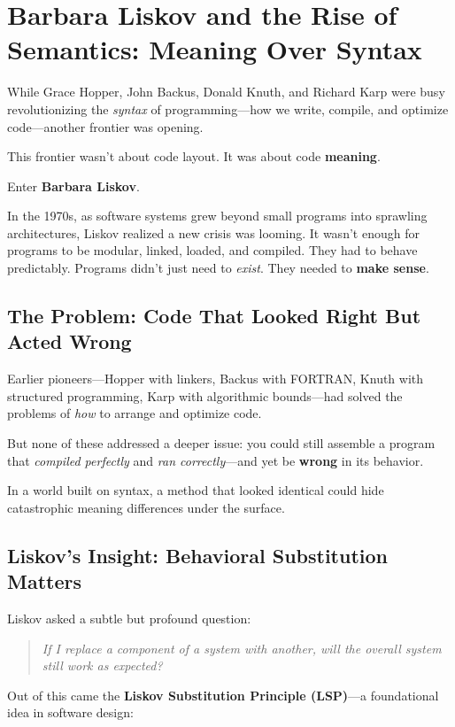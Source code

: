 \section{Barbara Liskov and the Rise of Semantics: Meaning Over Syntax}

While Grace Hopper, John Backus, Donald Knuth, and Richard Karp were busy revolutionizing the \textit{syntax} of programming—how we write, compile, and optimize code—another frontier was opening.

This frontier wasn’t about code layout. It was about code \textbf{meaning}.

Enter \textbf{Barbara Liskov}.

In the 1970s, as software systems grew beyond small programs into sprawling architectures, Liskov realized a new crisis was looming. It wasn’t enough for programs to be modular, linked, loaded, and compiled. They had to behave predictably. Programs didn’t just need to \emph{exist}. They needed to \textbf{make sense}.

\subsection{The Problem: Code That Looked Right But Acted Wrong}

Earlier pioneers—Hopper with linkers, Backus with FORTRAN, Knuth with structured programming, Karp with algorithmic bounds—had solved the problems of \textit{how} to arrange and optimize code.

But none of these addressed a deeper issue: you could still assemble a program that \textit{compiled perfectly} and \textit{ran correctly}—and yet be \textbf{wrong} in its behavior.

In a world built on syntax, a method that looked identical could hide catastrophic meaning differences under the surface.

\subsection{Liskov’s Insight: Behavioral Substitution Matters}

Liskov asked a subtle but profound question:

\begin{quote}
\textit{If I replace a component of a system with another, will the overall system still work as expected?}
\end{quote}

Out of this came the \textbf{Liskov Substitution Principle (LSP)}—a foundational idea in software design:

